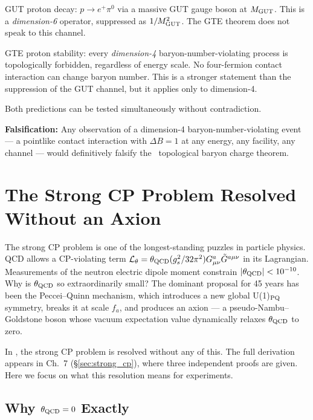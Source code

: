 \documentclass[11pt,openany]{book}
\theoremstyle{remark}
\newcommand{\GTE}{\text{GTE}}
\begin{document}
\begin{tcolorbox}[colback=yellow!8,colframe=yellow!60!black,
  title={Why This Is Not the Same as GUT Proton Decay}]
GUT proton decay: $p \to e^+\pi^0$ via a massive GUT gauge boson at $M_{\rm GUT}$.
This is a \emph{dimension-6} operator, suppressed as $1/M_{\rm GUT}^2$.  The GTE
theorem does not speak to this channel.

GTE proton stability: every \emph{dimension-4} baryon-number-violating process is
topologically forbidden, regardless of energy scale.  No four-fermion contact
interaction can change baryon number.  This is a stronger statement than the
suppression of the GUT channel, but it applies only to dimension-4.

Both predictions can be tested simultaneously without contradiction.
\end{tcolorbox}

\textbf{Falsification:}  Any observation of a dimension-4 baryon-number-violating
event --- a pointlike contact interaction with $\Delta B = 1$ at any energy, any
facility, any channel --- would definitively falsify the \GTE\ topological baryon
charge theorem.

\section{The Strong CP Problem Resolved Without an Axion}
\label{sec:strong_cp_new_physics}

The strong CP problem is one of the longest-standing puzzles in particle physics.  QCD
allows a CP-violating term $\mathcal{L}_\theta = \theta_{\rm QCD} (g_s^2/32\pi^2)
G^a_{\mu\nu}\tilde{G}^{a\mu\nu}$ in its Lagrangian.  Measurements of the neutron
electric dipole moment constrain $|\theta_{\rm QCD}| < 10^{-10}$.  Why is $\theta_{\rm QCD}$
so extraordinarily small?  The dominant proposal for 45 years has been the Peccei--Quinn
mechanism, which introduces a new global U(1)$_{\rm PQ}$ symmetry, breaks it at scale
$f_a$, and produces an axion --- a pseudo-Nambu--Goldstone boson whose vacuum expectation
value dynamically relaxes $\theta_{\rm QCD}$ to zero.

In \GTE, the strong CP problem is resolved without any of this.  The full derivation
appears in Ch.~7 (\S\ref{sec:strong_cp}), where three independent proofs are given.
Here we focus on what this resolution means for experiments.

\subsection*{Why $\theta_{\rm QCD} = 0$ Exactly}
\end{document}
